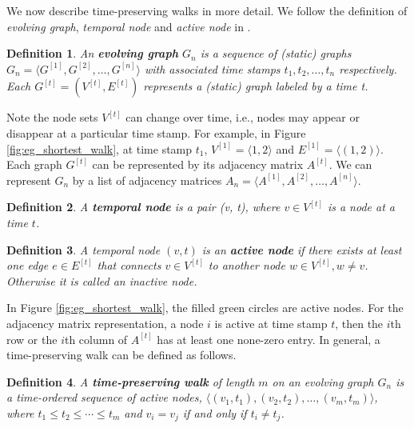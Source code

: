 \documentclass[12pt]{article}
\newtheorem{definition}{Definition}
\theoremstyle{definition}
\begin{document}
We now describe time-preserving walks in more detail. We follow the definition of
\emph{evolving graph}, \emph{temporal node} and \emph{active node} in \cite{chen16}.

\begin{definition}
  An \textbf{evolving graph} $G_n$ is a sequence of (static) graphs
$G_n = \langle G^{[1]}, G^{[2]},  \ldots ,G^{[n]} \rangle$ with associated time stamps
$t_1, t_2, \ldots, t_n$ respectively. Each $G^{[t]} = (V^{[t]}, E^{[t]})$ represents a (static) graph labeled by a time t.
\end{definition}

Note the node sets $V^{[t]}$ can change over time, i.e., nodes may appear or disappear at a particular time stamp.
For example, in Figure \ref{fig:eg_shortest_walk}, at time stamp $t_1$, $V^{[1]} = \langle 1, 2 \rangle$ and $E^{[1]} = \langle (1,2) \rangle$. Each graph $G^{[t]}$ can be represented by its adjacency matrix $A^{[t]}$.
We can represent $G_n$ by a list of adjacency matrices $A_n = \langle A^{[1]}, A^{[2]}, \ldots, A^{[n]} \rangle$.


\begin{definition}
  A \textbf{temporal node} is a pair (v, t), where $v \in V^{[t]}$ is a node at a time $t$.
\end{definition}


\begin{definition}
  A temporal node $(v, t)$ is an \textbf{active node} if there exists at least one edge $e \in E^{[t]}$ that connects $v \in V^{[t]}$ to another node $w \in V^{[t]}, w\ne v$. Otherwise it is called an inactive node.
\end{definition}

In Figure \ref{fig:eg_shortest_walk}, the filled green circles are active nodes. For the adjacency matrix representation, a node $i$ is active at time stamp $t$, then
the $i$th row or the $i$th column of $A^{[t]}$ has at least one none-zero entry.
 In general, a time-preserving walk can be defined as follows.

\begin{definition}
A \textbf{time-preserving walk}  of length $m$ on an evolving graph $G_n$ is a time-ordered sequence of active nodes, $\langle (v_1, t_1), (v_2, t_2), \ldots, (v_m, t_m) \rangle$, where $t_1 \le t_2 \le \cdots \le t_m$ and
$v_i = v_j$ if and only if $t_i \ne t_j$.
\end{definition}
\end{document}
